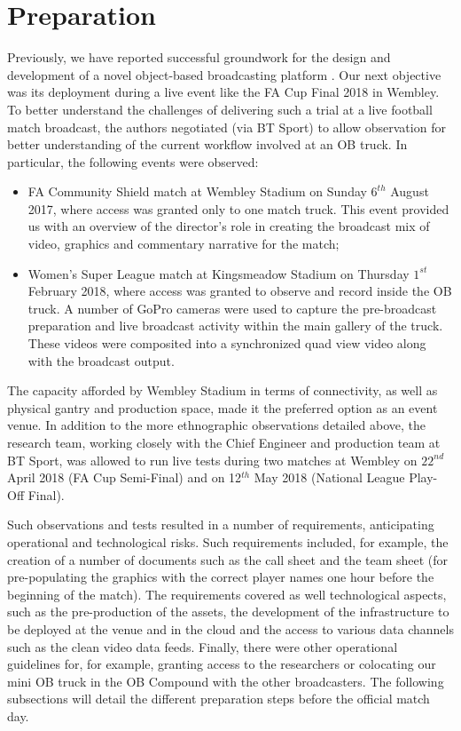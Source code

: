 \documentclass[sigchi-a, authorversion]{acmart}
\begin{document}
\section{Preparation}

Previously, we have reported successful groundwork for the design and development
of a novel object-based broadcasting platform \cite{kegel2017, Li:2018_CHI, Li:2018_TVX}.
Our next objective was its deployment during a live event like the FA Cup Final
2018 in Wembley. To better understand the challenges of delivering such a trial at
a live football match broadcast, the authors negotiated (via BT Sport) to allow
observation for better understanding of the current workflow involved at an OB
truck. In particular, the following events were observed:

\begin{itemize}
  \item FA Community Shield match at Wembley Stadium on Sunday $6^{th}$ August 2017,
        where access was granted only to one match truck. This event provided us
        with an overview of the director's role in creating the broadcast mix of
        video, graphics and commentary narrative for the match;
  \item Women's Super League match at Kingsmeadow Stadium on Thursday $1^{st}$
        February 2018, where access was granted to observe and record inside the OB
        truck. A number of GoPro cameras were used to capture the pre-broadcast
        preparation and live broadcast activity within the main gallery of the
        truck. These videos were composited into a synchronized quad view video
        along with the broadcast output.
\end{itemize}

The capacity afforded by Wembley Stadium in terms of connectivity,
as well as physical gantry and production space, made it the preferred option as
an event venue. In addition to the more ethnographic observations detailed above,
the research team, working closely with the Chief Engineer and production team
at BT Sport, was allowed to run live tests during two matches at Wembley on $22^{nd}$
April 2018 (FA Cup Semi-Final) and on 12$^{th}$ May 2018 (National League Play-Off Final).

Such observations and tests resulted in a number of requirements, anticipating
operational and technological risks. Such requirements included, for example,
the creation of a number of documents such as the call sheet and the team sheet
(for pre-populating the graphics with the correct player names one hour before
the beginning of the match). The requirements covered as well technological
aspects, such as the pre-production of the assets, the development of the
infrastructure to be deployed at the venue and in the cloud and the access to
various data channels such as the clean video data feeds. Finally, there were
other operational guidelines for, for example, granting access to the researchers
or colocating our mini OB truck in the OB Compound with the other broadcasters.
The following subsections will detail the different preparation steps before the
official match day.
\end{document}
